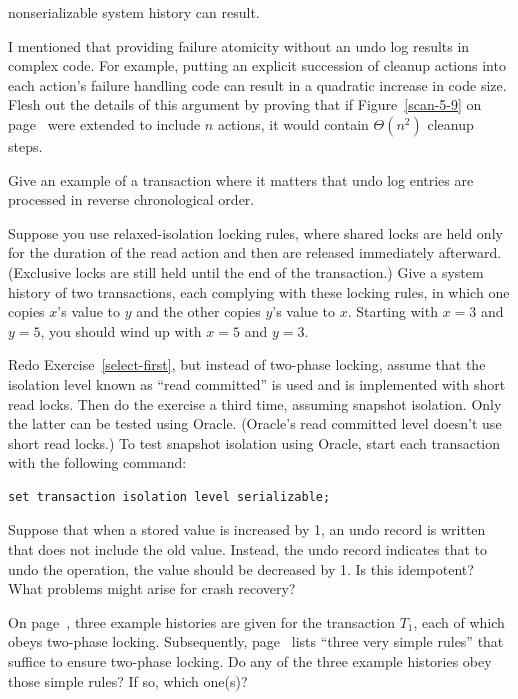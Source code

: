 \begin{chapterEnumerate}
\begin{enumerate}
nonserializable system history can result.
\end{enumerate}
\item\label{quadratic-undo-ex}
I mentioned that providing failure atomicity without an undo log
results in complex code.  For example, putting an explicit succession
of cleanup actions into each action's failure handling code can result in a
quadratic increase in code size.  Flesh out the details of this
argument by proving that if Figure~\ref{scan-5-9} on
page~\pageref{scan-5-9} were extended to include $n$ actions, it would
contain $\Theta(n^2)$ cleanup steps.
\item\label{reverse-chron-undo-ex}
Give an example of a transaction where it matters that undo log
entries are processed in reverse chronological order.
\item
\label{relaxed-swap-exercise}
Suppose you use relaxed-isolation locking rules, where shared locks are
held only for the duration of the read action and then are released
immediately afterward.  (Exclusive locks are still held until the end
of the transaction.)  Give a system history of two transactions, each
complying with these locking rules, in which one copies $x$'s value to $y$
and the other copies $y$'s value to $x$.  Starting with $x=3$ and
$y=5$, you should wind up with $x=5$ and $y=3$.
\item
Redo Exercise~\ref{select-first}, but instead of two-phase locking,
assume that the isolation level known as ``read
committed'' is used and is implemented with short read locks.  Then
do the exercise a third time, assuming snapshot isolation.  Only
the latter can be tested using Oracle.  (Oracle's read committed level
doesn't use short read locks.)  To test snapshot isolation using
Oracle, start each transaction with the following command:
\begin{verbatim}
set transaction isolation level serializable;
\end{verbatim}
\item
Suppose that when a stored value is increased by 1, an undo record
is written that does not include the old value.  Instead,
the undo record indicates that to undo the operation, the value should
be decreased by 1.  Is this idempotent?  What problems might arise
for crash recovery?
\item
On page~\pageref{two-phase-examples}, three example histories are given for the transaction $T_1$, each of which obeys two-phase locking.  Subsequently, page~\pageref{simple-two-phase} lists ``three very simple rules'' that suffice to ensure two-phase locking.  Do any of the three example histories obey those simple rules?  If so, which one(s)?

\end{chapterEnumerate}
